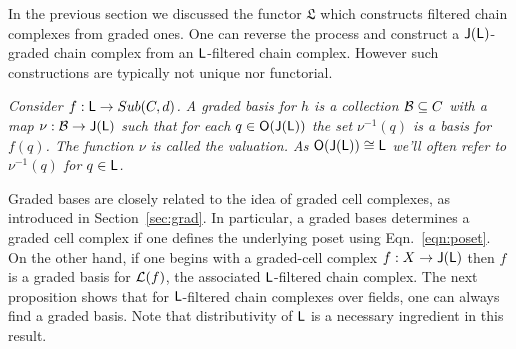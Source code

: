 In the previous section we discussed the functor $\mathfrak{L}$ which constructs filtered chain complexes from graded ones.  One can reverse the process and construct a ${\mathsf J}({\mathsf L})$-graded chain complex from an ${\mathsf L}$-filtered chain complex.  However such constructions are typically not unique nor functorial.


\begin{defn}
{\em
Consider $f:{\mathsf L}\to Sub(C,d)$.  A {\em graded basis for $h$} is a collection ${\mathcal B}\subseteq C$ with a map $\nu:{\mathcal B}\to {\mathsf J}({\mathsf L})$ such that for each $q\in {\mathsf O}({\mathsf J}({\mathsf L}))$ the set $\nu^{-1}(q)$ is a basis for $f(q)$.
 The function $\nu$ is called the {\em valuation}. As ${\mathsf O}({\mathsf J}({\mathsf L})) \cong {\mathsf L}$ we'll often refer to $\nu^{-1}(q)$ for $q\in {\mathsf L}$.  
}
\end{defn}

Graded bases are closely related to the idea of graded cell complexes, as introduced in Section~\ref{sec:grad}.  In particular, a graded bases determines a graded cell complex if one defines the underlying poset using Eqn.~\ref{eqn:poset}.  On the other hand, if one begins with a graded-cell complex $f:X\to {\mathsf J}({\mathsf L})$ then $f$ is a graded basis for ${\mathcal L}(f)$, the associated ${\mathsf L}$-filtered chain complex.   The next proposition shows that for ${\mathsf L}$-filtered chain complexes over fields, one can always find a graded basis.  Note that distributivity of ${\mathsf L}$ is a necessary ingredient in this result.

